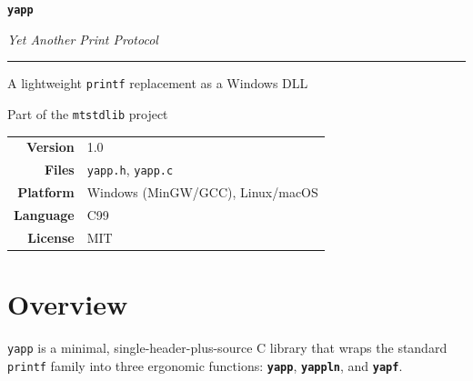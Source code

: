 \documentclass[11pt, a4paper]{article}
\newcommand{\fn}[1]{\texttt{\textbf{\textcolor{yapporange}{#1}}}}
\begin{document}

\begin{titlepage}
  \centering
  \vspace*{3cm}

  {\fontsize{52}{60}\selectfont\bfseries\texttt{\textcolor{yapporange}{yapp}}}

  \vspace{0.4cm}
  {\Large\textit{Yet Another Print Protocol}}

  \vspace{0.3cm}
  \rule{8cm}{0.5pt}

  \vspace{0.6cm}
  {\large A lightweight \texttt{printf} replacement as a Windows DLL}

  \vspace{0.4cm}
  {\normalsize Part of the \texttt{mtstdlib} project}

  \vfill

  \begin{tabular}{rl}
    \textbf{Version}  & 1.0 \\
    \textbf{Files}    & \texttt{yapp.h}, \texttt{yapp.c} \\
    \textbf{Platform} & Windows (MinGW/GCC), Linux/macOS \\
    \textbf{Language} & C99 \\
    \textbf{License}  & MIT \\
  \end{tabular}

  \vspace{2cm}
\end{titlepage}

\tableofcontents
\newpage

\section{Overview}

\texttt{yapp} is a minimal, single-header-plus-source C library that wraps the standard
\texttt{printf} family into three ergonomic functions: \fn{yapp}, \fn{yappln}, and \fn{yapf}.
\end{document}
